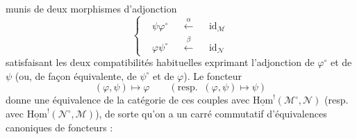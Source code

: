 \documentclass[11pt]{article}
\newcommand{\uHom}{\underline{\mathrm{Hom}}}
\begin{document}
munis de deux morphismes d'adjonction
\[
\left\{
\begin{aligned}
&\psi\varphi^\circ &&\xleftarrow{\alpha} &&\mathrm{id}_{\mathcal{M}}\\
&\varphi\psi^\circ &&\xleftarrow{\beta} &&\mathrm{id}_{\mathcal{N}}
\end{aligned}
\right.
\tag*{(4.1.15)}
\]
satisfaisant les deux compatibilités habituelles exprimant l'adjonction de $\varphi^\circ$ et de $\psi$ (ou, de façon équivalente, de $\psi^\circ$ et de $\varphi$). Le foncteur
\[
(\varphi,\psi) \longmapsto \varphi \qquad (\text{resp.}\;\; (\varphi,\psi) \longmapsto \psi)
\]
donne une équivalence de la catégorie de ces couples avec $\uHom^!(\mathcal{M}^\circ,\mathcal{N})$ (resp. avec $\uHom^!(\mathcal{N}^\circ,\mathcal{M})$), de sorte qu'on a un carré commutatif d'équivalences canoniques de foncteurs :
\end{document}
